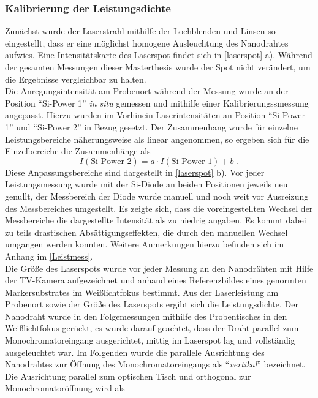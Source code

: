 \subsubsection{Kalibrierung der Leistungsdichte} Zunächst wurde der Laserstrahl
mithilfe der Lochblenden und Linsen so eingestellt, dass er eine möglichst
homogene Ausleuchtung des Nanodrahtes aufwies. Eine Intensitätskarte des
Laserspot findet sich in \autoref{laserspot} a). Während der gesamten Messungen
dieser Masterthesis wurde der Spot nicht verändert, um die Ergebnisse
vergleichbar zu halten.\\ Die Anregungsintensität am Probenort während der
Messung wurde an der Position ``Si-Power 1'' \textit{in situ} gemessen und
mithilfe einer Kalibrierungssmessung angepasst. Hierzu wurden im Vorhinein
Laserintensitäten an Position ``Si-Power 1'' und ``Si-Power 2'' in Bezug
gesetzt. Der Zusammenhang wurde für einzelne Leistungsbereiche näherungsweise
als linear angenommen, so ergeben sich für die Einzelbereiche die Zusammenhänge
als \begin{equation} I(\text{Si-Power 2})=  a \cdot I(\text{Si-Power 1})  + b
\text{ .} \end{equation} Diese Anpassungsbereiche sind dargestellt in
\autoref{laserspot} b). Vor jeder Leistungsmessung wurde mit der Si-Diode an
beiden Positionen jeweils neu genullt, der Messbereich der Diode wurde manuell
und noch weit vor Ausreizung des Messbereiches umgestellt. Es zeigte sich, dass
die voreingestellten Wechsel der Messbereiche die dargestellte Intensität als zu
niedrig angaben. Es kommt dabei zu teils drastischen Absättigungseffekten, die
durch den manuellen Wechsel umgangen werden konnten. Weitere Anmerkungen hierzu
befinden sich im Anhang im \autoref{Leistmess}. \\ Die Größe des Laserspots
wurde vor jeder Messung an den Nanodrähten mit Hilfe der TV-Kamera aufgezeichnet
und anhand eines Referenzbildes eines genormten Markersubstrates im
Weißlichtfokus bestimmt. Aus der Laserleistung am Probenort sowie der Größe des
Laserspots ergibt sich die Leistungsdichte. Der Nanodraht wurde in den
Folgemessungen mithilfe des Probentisches in den Weißlichtfokus gerückt, es
wurde darauf geachtet, dass der Draht parallel zum Monochromatoreingang
ausgerichtet, mittig im Laserspot lag und vollständig ausgeleuchtet war. Im
Folgenden wurde die parallele Ausrichtung des Nanodrahtes zur Öffnung des
Monochromatoreingangs als ``\textit{vertikal}'' bezeichnet. Die Ausrichtung
parallel zum optischen Tisch und orthogonal zur Monochromatoröffnung wird als
